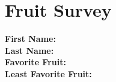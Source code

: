 \documentclass{article}
\begin{document}
\section*{Fruit Survey}

\begin{Form}
  \textbf{First Name:} \TextField[name=firstname]{} \\
  \textbf{Last Name:}  \TextField[name=name]{} \\
  \textbf{Favorite Fruit:} \TextField[name=favfruit]{} \\
  \textbf{Least Favorite Fruit:} \TextField[name=notfavfruit]{} \\
\end{Form}
\end{document}

